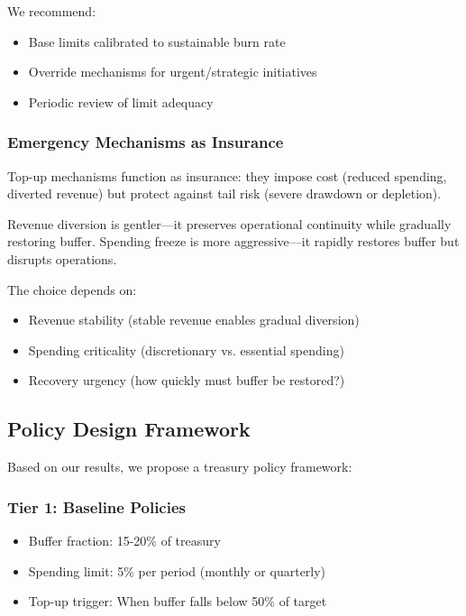 We recommend:
\begin{itemize}
    \item Base limits calibrated to sustainable burn rate
    \item Override mechanisms for urgent/strategic initiatives
    \item Periodic review of limit adequacy
\end{itemize}

\subsubsection{Emergency Mechanisms as Insurance}

Top-up mechanisms function as insurance: they impose cost (reduced spending, diverted revenue) but protect against tail risk (severe drawdown or depletion).

Revenue diversion is gentler---it preserves operational continuity while gradually restoring buffer. Spending freeze is more aggressive---it rapidly restores buffer but disrupts operations.

The choice depends on:
\begin{itemize}
    \item Revenue stability (stable revenue enables gradual diversion)
    \item Spending criticality (discretionary vs. essential spending)
    \item Recovery urgency (how quickly must buffer be restored?)
\end{itemize}

\subsection{Policy Design Framework}

Based on our results, we propose a treasury policy framework:

\subsubsection{Tier 1: Baseline Policies}

\begin{itemize}
    \item Buffer fraction: 15-20\% of treasury
    \item Spending limit: 5\% per period (monthly or quarterly)
    \item Top-up trigger: When buffer falls below 50\% of target
\end{itemize}

